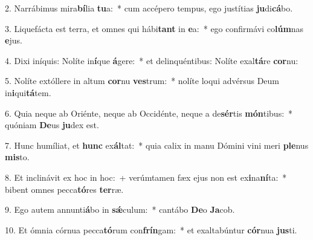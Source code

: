 ﻿2. Narrábimus mira\textbf{bí}lia \textbf{tu}a:~* cum accépero tempus, ego justítias \textbf{ju}di\textbf{cá}bo.

3. Liquefácta est terra, et omnes qui hábi\textbf{tant} in \textbf{e}a:~* ego confirmávi co\textbf{lúm}nas \textbf{e}jus.

4. Dixi iníquis: Nolíte in\textbf{í}que \textbf{á}gere:~* et delinquéntibus: Nolíte exal\textbf{tá}re \textbf{cor}nu:

5. Nolíte extóllere in altum \textbf{cor}nu \textbf{ves}trum:~* nolíte loqui advérsus Deum in\textbf{i}qui\textbf{tá}tem.

6. Quia neque ab Oriénte, neque ab Occidénte, neque a de\textbf{sér}tis \textbf{món}tibus:~* quóniam \textbf{De}us \textbf{ju}dex est.

7. Hunc humíliat, et \textbf{hunc} ex\textbf{ál}tat:~* quia calix in manu Dómini vini meri \textbf{ple}nus \textbf{mis}to.

8. Et inclinávit ex hoc in hoc:~+ verúmtamen fæx ejus non est ex\textbf{i}na\textbf{ní}ta:~* bibent omnes pecca\textbf{tó}res \textbf{ter}ræ.

9. Ego autem annunti\textbf{á}bo in \textbf{sǽ}culum:~* cantábo \textbf{De}o \textbf{Ja}cob.

10. Et ómnia córnua pecca\textbf{tó}rum con\textbf{frín}gam:~* et exaltabúntur \textbf{cór}nua \textbf{jus}ti.